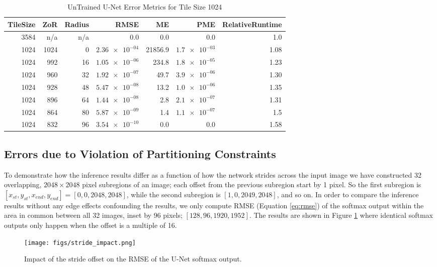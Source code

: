 \documentclass[runningheads]{llncs}
\begin{document}
\begin{table}[h!]
	\centering
\caption{UnTrained U-Net Error Metrics for Tile Size 1024}
\label{tab:tile_size_1024}
\begin{tabular}{r|r|r|r|r|r|r}
	TileSize & ZoR & Radius & RMSE    & ME & PME & RelativeRuntime \\ 
	\hline
3584 & n/a & n/a & 0.0 & 0.0 & 0.0 & 1.0 \\
1024 & 1024 & 0 & $\num{2.36e-04}$ & 21856.9 & $\num{1.7e-03}$ & 1.08 \\
1024 & 992 & 16 & $\num{1.05e-06}$ & 234.8 & $\num{1.8e-05}$ & 1.23 \\
1024 & 960 & 32 & $\num{1.92e-07}$ & 49.7 & $\num{3.9e-06}$ & 1.30 \\
1024 & 928 & 48 & $\num{5.47e-08}$ & 13.2 & $\num{1.0e-06}$ & 1.35 \\
1024 & 896 & 64 & $\num{1.44e-08}$ & 2.8 & $\num{2.1e-07}$ & 1.31 \\
1024 & 864 & 80 & $\num{5.87e-09}$ & 1.4 & $\num{1.1e-07}$ & 1.5 \\
1024 & 832 & 96 & $\num{3.54e-10}$ & 0.0 & 0.0 & 1.58 \\
\end{tabular}
\end{table}


\subsection{Errors due to Violation of Partitioning Constraints}

To demonstrate how the inference results differ as a function of how the network strides across the input image we have constructed 32 overlapping, $2048 \times 2048$ pixel subregions of an image; each offset from the previous subregion start by 1 pixel. So the first subregion is $[x_{st}, y_{st}, x_{end}, y_{end}] = [0, 0, 2048, 2048]$, while the second subregion is $[1, 0, 2049, 2048]$, and so on. In order to compare the inference results without any edge effects confounding the results, we only compute RMSE (Equation \ref{eq:rmse}) of the softmax output within the area in common between all 32 images, inset by 96 pixels; $[128, 96, 1920, 1952]$. The results are shown in Figure \ref{fig:stride-impact} where identical softmax outputs only happen when the offset is a multiple of 16.

\begin{figure}[h!]
		\centering
		\texttt{[image: figs/stride\_impact.png]}

	\caption{Impact of the stride offset on the RMSE of the U-Net softmax output.}
	\label{fig:stride-impact}
\end{figure} 
\end{document}
